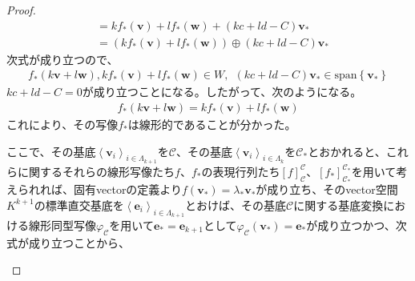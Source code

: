 \documentclass[dvipdfmx]{jsarticle}
\begin{document}
\begin{proof}
\begin{align*}
&= kf_{*}\left( \mathbf{v} \right) + lf_{*}\left( \mathbf{w} \right) + (kc + ld - C)\mathbf{v}_{*}\\
&= \left( kf_{*}\left( \mathbf{v} \right) + lf_{*}\left( \mathbf{w} \right) \right) \oplus (kc + ld - C)\mathbf{v}_{*}
\end{align*}
次式が成り立つので、
\begin{align*}
f_{*}\left( k\mathbf{v} + l\mathbf{w} \right),kf_{*}\left( \mathbf{v} \right) + lf_{*}\left( \mathbf{w} \right) \in W,\ \ (kc + ld - C)\mathbf{v}_{*} \in \mathrm{span}\left\{ \mathbf{v}_{*} \right\}
\end{align*}
$kc + ld - C = 0$が成り立つことになる。したがって、次のようになる。
\begin{align*}
f_{*}\left( k\mathbf{v} + l\mathbf{w} \right) = kf_{*}\left( \mathbf{v} \right) + lf_{*}\left( \mathbf{w} \right)
\end{align*}
これにより、その写像$f_{*}$は線形的であることが分かった。\par
ここで、その基底$\left\langle \mathbf{v}_{i} \right\rangle_{i \in \varLambda_{k + 1}}$を$\mathcal{C}$、その基底$\left\langle \mathbf{v}_{i} \right\rangle_{i \in \varLambda_{k}}$を$\mathcal{C}_{*}$とおかれると、これらに関するそれらの線形写像たち$f$、$f_{*}$の表現行列たち$[ f]_{\mathcal{C}}^{\mathcal{C}}$、$\left[ f_{*} \right]_{\mathcal{C}_{*}}^{\mathcal{C}_{*}}$を用いて考えられれば、固有vectorの定義より$f\left( \mathbf{v}_{*} \right) = \lambda_{*}\mathbf{v}_{*}$が成り立ち、そのvector空間$K^{k + 1}$の標準直交基底を$\left\langle \mathbf{e}_{i} \right\rangle_{i \in \varLambda_{k + 1}}$とおけば、その基底$\mathcal{C}$に関する基底変換における線形同型写像$\varphi_{\mathcal{C}}$を用いて$\mathbf{e}_{*} = \mathbf{e}_{k + 1}$として$\varphi_{\mathcal{C}}\left( \mathbf{v}_{*} \right) = \mathbf{e}_{*}$が成り立つかつ、次式が成り立つことから、
\begin{center}
\end{center}
\end{proof}
\end{document}
